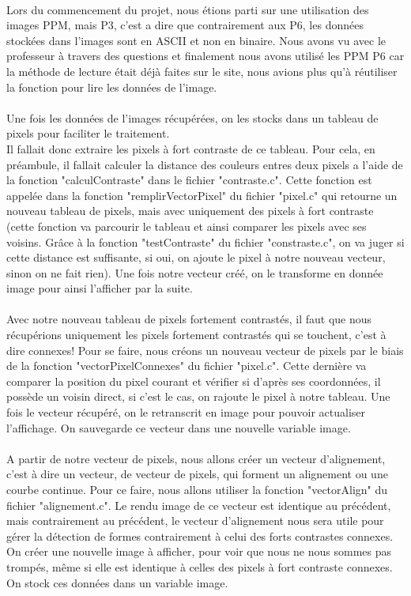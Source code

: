 \documentclass[a4paper , 10pt]{article}
\begin{document}
\paragraph{}
Lors du commencement du projet, nous étions parti sur une utilisation des images PPM, mais P3, c'est a dire que contrairement aux P6, les données stockées dans l'images sont en ASCII et non en binaire. Nous avons vu avec le professeur à travers des questions et finalement nous avons utilisé les PPM P6 car la méthode de lecture était déjà faites sur le site, nous avions plus qu'à réutiliser la fonction pour lire les données de l'image.
\paragraph{}
Une fois les données de l'images récupérées, on les stocks dans un tableau de pixels pour faciliter le traitement.\\Il fallait donc extraire les pixels à fort contraste de ce tableau. Pour cela, en préambule, il fallait calculer la distance des couleurs entres deux pixels a l'aide de la fonction "calculContraste" dans le fichier "contraste.c". Cette fonction est appelée dans la fonction "remplirVectorPixel" du fichier "pixel.c" qui retourne un nouveau tableau de pixels, mais avec uniquement des pixels à fort contraste (cette fonction va parcourir le tableau et ainsi comparer les pixels avec ses voisins. Grâce à la fonction "testContraste" du fichier "constraste.c", on va juger si cette distance est suffisante, si oui, on ajoute le pixel à notre nouveau vecteur, sinon on ne fait rien). Une fois notre vecteur créé, on le transforme en donnée image pour ainsi l'afficher par la suite.
\paragraph{}
Avec notre nouveau tableau de pixels fortement contrastés, il faut que nous récupérions uniquement les pixels fortement contrastés qui se touchent, c'est à dire connexes! Pour se faire, nous créons un nouveau vecteur de pixels par le biais de la fonction "vectorPixelConnexes" du fichier "pixel.c". Cette dernière va comparer la position du pixel courant et vérifier si d'après ses coordonnées, il possède un voisin direct, si c'est le cas, on rajoute le pixel à notre tableau. Une fois le vecteur récupéré, on le retranscrit en image pour pouvoir actualiser l'affichage. On sauvegarde ce vecteur dans une nouvelle variable image.
\paragraph{}
A partir de notre vecteur de pixels, nous allons créer un vecteur d'alignement, c'est à dire un vecteur, de vecteur de pixels, qui forment un alignement ou une courbe continue. Pour ce faire, nous allons utiliser la fonction "vectorAlign" du fichier "alignement.c". Le rendu image de ce vecteur est identique au précédent, mais contrairement au précédent, le vecteur d'alignement nous sera utile pour gérer la détection de formes contrairement à celui des forts contrastes connexes. On créer une nouvelle image à afficher, pour voir que nous ne nous sommes pas trompés, même si elle est identique à celles des pixels à fort contraste connexes. On stock ces données dans un variable image.
\end{document}
